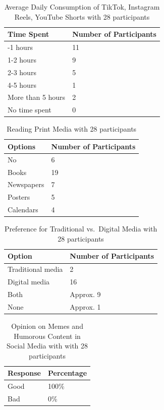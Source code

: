 \documentclass{article}
\begin{document}
\begin{longtable}[]{@{}ll@{}}
\caption{Average Daily Consumption of TikTok, Instagram Reels, YouTube Shorts with 28 participants} \label{average-daily-consumption-of-tiktok-instagram-reels-youtube-shorts} \\
\toprule\noalign{}
Time Spent & Number of Participants \\
\midrule\noalign{}
\endhead
\bottomrule\noalign{}
\endlastfoot
0-1 hours & 11 \\
1-2 hours & 9 \\
2-3 hours & 5 \\
4-5 hours & 1 \\
More than 5 hours & 2 \\
No time spent & 0 \\
\end{longtable}

\begin{longtable}[]{@{}ll@{}}
\caption{Reading Print Media with 28 participants} \label{reading-print-media} \\
\toprule\noalign{}
Options & Number of Participants \\
\midrule\noalign{}
\endhead
\bottomrule\noalign{}
\endlastfoot
No & 6 \\
Books & 19 \\
Newspapers & 7 \\
Posters & 5 \\
Calendars & 4 \\
\end{longtable}

\begin{longtable}[]{@{}ll@{}}
\caption{Preference for Traditional vs.~Digital Media with 28 participants} \label{preference-for-traditional-vs.-digital-media} \\
\toprule\noalign{}
Option & Number of Participants \\
\midrule\noalign{}
\endhead
\bottomrule\noalign{}
\endlastfoot
Traditional media & 2 \\
Digital media & 16 \\
Both & Approx. 9 \\
None & Approx. 1 \\
\end{longtable}

\begin{longtable}[]{@{}ll@{}}
\caption{Opinion on Memes and Humorous Content in Social Media with with 28 participants} \label{opinion-on-memes-and-humorous-content-in-social-media} \\
\toprule\noalign{}
Response & Percentage \\
\midrule\noalign{}
\endhead
\bottomrule\noalign{}
\endlastfoot
Good & 100\% \\
Bad & 0\% \\
\end{longtable}
\end{document}
